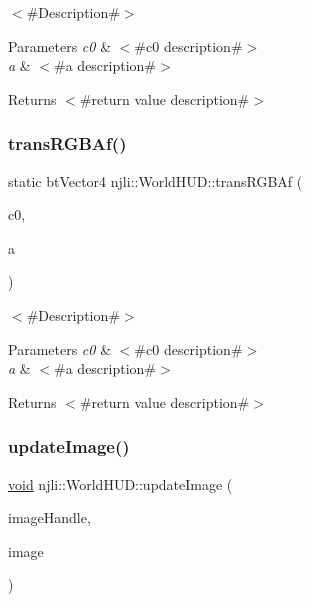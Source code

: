 $<$\#\+Description\#$>$


\begin{DoxyParams}{Parameters}
{\em c0} & $<$\#c0 description\#$>$ \\
\hline
{\em a} & $<$\#a description\#$>$\\
\hline
\end{DoxyParams}
\begin{DoxyReturn}{Returns}
$<$\#return value description\#$>$ 
\end{DoxyReturn}
\mbox{\label{classnjli_1_1_world_h_u_d_a6b41d149bb7c30b7a2cb0d49c23d35ab}} 
\subsubsection{\texorpdfstring{trans\+R\+G\+B\+Af()}{transRGBAf()}}
{\footnotesize\ttfamily static bt\+Vector4 njli\+::\+World\+H\+U\+D\+::trans\+R\+G\+B\+Af (\begin{DoxyParamCaption}\item[{const bt\+Vector4 \&}]{c0,  }\item[{\mbox{\hyperlink{_util_8h_a5f6906312a689f27d70e9d086649d3fd}{f32}}}]{a }\end{DoxyParamCaption})\hspace{0.3cm}{\ttfamily [static]}}

$<$\#\+Description\#$>$


\begin{DoxyParams}{Parameters}
{\em c0} & $<$\#c0 description\#$>$ \\
\hline
{\em a} & $<$\#a description\#$>$\\
\hline
\end{DoxyParams}
\begin{DoxyReturn}{Returns}
$<$\#return value description\#$>$ 
\end{DoxyReturn}
\mbox{\label{classnjli_1_1_world_h_u_d_a4e1dcdcdbaf62f4b9fd0412cf5ee23da}} 
\subsubsection{\texorpdfstring{update\+Image()}{updateImage()}}
{\footnotesize\ttfamily \mbox{\hyperlink{_thread_8h_af1e856da2e658414cb2456cb6f7ebc66}{void}} njli\+::\+World\+H\+U\+D\+::update\+Image (\begin{DoxyParamCaption}\item[{\mbox{\hyperlink{_util_8h_aa62c75d314a0d1f37f79c4b73b2292e2}{s32}}}]{image\+Handle,  }\item[{const \mbox{\hyperlink{classnjli_1_1_image}{Image}} \&}]{image }\end{DoxyParamCaption})}

